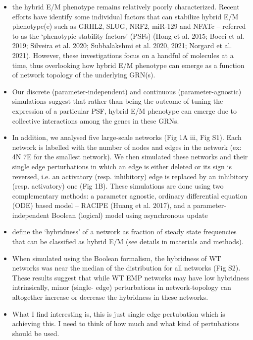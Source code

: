 \documentclass{article}
\begin{document}
\begin{itemize}

\item the hybrid E/M phenotype remains relatively poorly
characterized. Recent efforts have identify some individual factors that can stabilize hybrid E/M
phenotype(e) such as GRHL2, SLUG, NRF2, miR-129 and NFATc – referred to as the ‘phenotypic
stability factors’ (PSFs) (Hong et al. 2015; Bocci et al. 2019; Silveira et al. 2020; Subbalakshmi et
al. 2020, 2021; Norgard et al. 2021). However, these investigations focus on a handful of molecules
at a time, thus overlooking how hybrid E/M phenotype can emerge as a function of network
topology of the underlying GRN(s).

\item Our discrete (parameter-independent) and continuous (parameter-agnostic) simulations suggest that rather
than being the outcome of tuning the expression of a particular PSF, hybrid E/M phenotype can
emerge due to collective interactions among the genes in these GRNs. 

\item  In addition, we analysed five large-scale networks (Fig 1A iii, Fig
S1). Each network is labelled with the number of nodes and edges in the network (ex: 4N 7E for
the smallest network). We then simulated these networks and their single edge perturbations in
which an edge is either deleted or its sign is reversed, i.e. an activatory (resp. inhibitory) edge is
replaced by an inhibitory (resp. activatory) one (Fig 1B). These simulations are done using two
complementary methods: a parameter agnostic, ordinary differential equation (ODE) based model
– RACIPE (Huang et al. 2017), and a parameter-independent Boolean (logical) model using
asynchronous update


\item define the
‘hybridness’ of a network as fraction of steady state frequencies that can be classified as hybrid
E/M (see details in materials and methods).

\item When simulated using the Boolean formalism, the
hybridness of WT networks was near the median of the distribution for all networks (Fig S2). These
results suggest that while WT EMP networks may have low hybridness intrinsically, minor (single-
edge) perturbations in network-topology can altogether increase or decrease the hybridness in
these networks. 

\item What I find interesting is, this is just single edge pertubation which is achieving this. I need to think of how much and what kind of pertubations should be used. 


\end{itemize}
\end{document}
